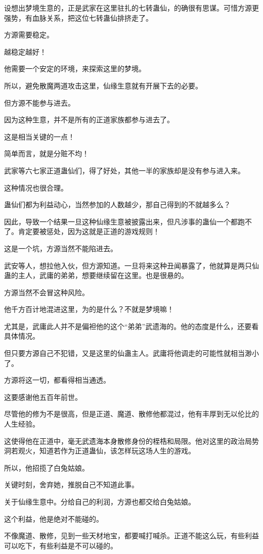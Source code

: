 \begin{this_body}
设想出梦境生意的，正是武家在这里驻扎的七转蛊仙，的确很有思谋。可惜方源更强势，有血脉关系，把这位七转蛊仙排挤走了。

方源需要稳定。

越稳定越好！

他需要一个安定的环境，来探索这里的梦境。

所以，避免散魔两道攻击这里，仙缘生意就有开展下去的必要。

但方源不能参与进去。

因为这种生意，并不是所有的正道家族都参与进去了。

这是相当关键的一点！

简单而言，就是分赃不均！

武家等六七家正道蛊仙们，得了好处，其他一半的家族却是没有参与进入来。

这种情况也很合理。

蛊仙们都为利益动心，当然参加的人数越少，那自己得到的不就越多么？

因此，导致一个结果一旦这种仙缘生意被披露出来，但凡涉事的蛊仙一个都跑不了。肯定要被惩处，因为这就是正道的游戏规则！

这是一个坑，方源当然不能陷进去。

武安等人，想拉他入伙，但方源知道。一旦将来这种丑闻暴露了，他就算是两只仙蛊的主人，武庸的弟弟，想要继续留在这里。也是很悬的。

方源当然不会冒这种风险。

他千方百计地混进这里，为的是什么？不就是梦境嘛！

尤其是，武庸此人并不是偏袒他的这个“弟弟”武遗海的。他的态度是什么，还要看具体情况。

但只要方源自己不犯错，又是这里的仙蛊主人。武庸将他调走的可能性就相当渺小了。

方源将这一切，都看得相当通透。

这要感谢他五百年前世。

尽管他的修为不是很高，但是正道、魔道、散修他都混过，他有丰厚到无以伦比的人生经验。

这使得他在正道中，毫无武遗海本身散修身份的桎梏和局限。他对这里的政治局势洞若观火，知道若作为正道蛊仙，该怎样玩这场人生的游戏。

所以，他招揽了白兔姑娘。

关键时刻，舍弃她，推脱自己不知道此事。

关于仙缘生意中。分给自己的利润，方源也都交给白兔姑娘。

这个利益，他是绝对不能碰的。

不像魔道、散修，见到一些天材地宝，都要喊打喊杀。正道不能这么玩，有些利益可以吃下，有些利益是不可以碰的。


\end{this_body}
